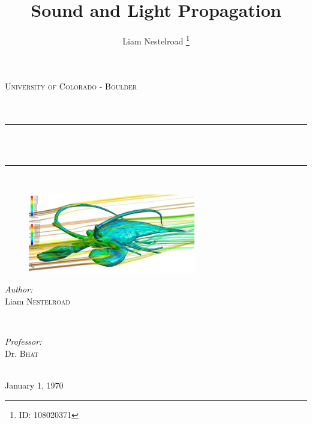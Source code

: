\documentclass[conf]{new-aiaa}
\title{Sound and Light Propagation}
\author{Liam Nestelroad \footnote{ID: 108020371}}
\begin{document}
\begin{titlepage}

\newcommand{\HRule}{\rule{\linewidth}{0.5mm}}

\center
 
\textsc{\LARGE University of Colorado - Boulder}\\[1.5cm]
\textsc{}\\[0.5cm] %
\textsc{}\\[0.5cm] %

\HRule \\[0.4cm]
{ \huge \bfseries <PAPER TITLE>}\\[0.4cm] 
\HRule \\[1.5cm]

\begin{figure}[H]
    \centering
    \includegraphics[width=0.65\textwidth]{template_image.jpeg}
\end{figure}



\begin{minipage}{0.4\textwidth}
\begin{flushleft} \large
\emph{Author:}\\
Liam \textsc{Nestelroad} 
\end{flushleft}
\end{minipage}
~
\begin{minipage}{0.4\textwidth}
\begin{flushright} \large
\emph{Professor:} \\
Dr. \textsc{Bhat} 
\end{flushright}
\end{minipage}\\[1cm]

{\large January 1, 1970}\\[2cm] 
 
\vfill

\end{titlepage}

\newpage
\renewcommand\contentsname{Table of Contents}
\doublespacing
\tableofcontents
\singlespacing
{}
\newpage
\end{document}
